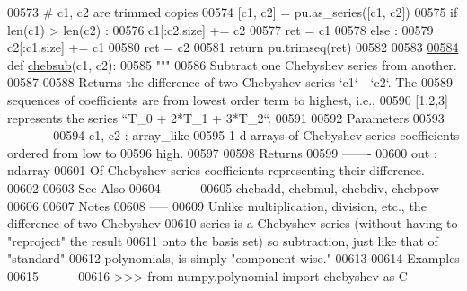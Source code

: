 \begin{DoxyCode}
00573     \textcolor{comment}{# c1, c2 are trimmed copies}
00574     [c1, c2] = pu.as\_series([c1, c2])
00575     \textcolor{keywordflow}{if} len(c1) > len(c2) :
00576         c1[:c2.size] += c2
00577         ret = c1
00578     \textcolor{keywordflow}{else} :
00579         c2[:c1.size] += c1
00580         ret = c2
00581     \textcolor{keywordflow}{return} pu.trimseq(ret)
00582 
00583 
\hypertarget{chebyshev_8py_source_l00584}{}\hyperlink{namespacepyneb_1_1utils_1_1chebyshev_ac07c70b217882a8c0a731ce9fdf743f0}{00584} \textcolor{keyword}{def }\hyperlink{namespacepyneb_1_1utils_1_1chebyshev_ac07c70b217882a8c0a731ce9fdf743f0}{chebsub}(c1, c2):
00585     \textcolor{stringliteral}{"""}
00586 \textcolor{stringliteral}{    Subtract one Chebyshev series from another.}
00587 \textcolor{stringliteral}{}
00588 \textcolor{stringliteral}{    Returns the difference of two Chebyshev series `c1` - `c2`.  The}
00589 \textcolor{stringliteral}{    sequences of coefficients are from lowest order term to highest, i.e.,}
00590 \textcolor{stringliteral}{    [1,2,3] represents the series ``T\_0 + 2*T\_1 + 3*T\_2``.}
00591 \textcolor{stringliteral}{}
00592 \textcolor{stringliteral}{    Parameters}
00593 \textcolor{stringliteral}{    ----------}
00594 \textcolor{stringliteral}{    c1, c2 : array\_like}
00595 \textcolor{stringliteral}{        1-d arrays of Chebyshev series coefficients ordered from low to}
00596 \textcolor{stringliteral}{        high.}
00597 \textcolor{stringliteral}{}
00598 \textcolor{stringliteral}{    Returns}
00599 \textcolor{stringliteral}{    -------}
00600 \textcolor{stringliteral}{    out : ndarray}
00601 \textcolor{stringliteral}{        Of Chebyshev series coefficients representing their difference.}
00602 \textcolor{stringliteral}{}
00603 \textcolor{stringliteral}{    See Also}
00604 \textcolor{stringliteral}{    --------}
00605 \textcolor{stringliteral}{    chebadd, chebmul, chebdiv, chebpow}
00606 \textcolor{stringliteral}{}
00607 \textcolor{stringliteral}{    Notes}
00608 \textcolor{stringliteral}{    -----}
00609 \textcolor{stringliteral}{    Unlike multiplication, division, etc., the difference of two Chebyshev}
00610 \textcolor{stringliteral}{    series is a Chebyshev series (without having to "reproject" the result}
00611 \textcolor{stringliteral}{    onto the basis set) so subtraction, just like that of "standard"}
00612 \textcolor{stringliteral}{    polynomials, is simply "component-wise."}
00613 \textcolor{stringliteral}{}
00614 \textcolor{stringliteral}{    Examples}
00615 \textcolor{stringliteral}{    --------}
00616 \textcolor{stringliteral}{    >>> from numpy.polynomial import chebyshev as C}

\end{DoxyCode}
